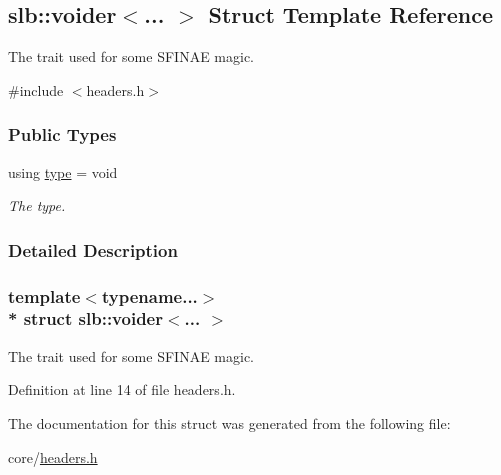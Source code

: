 \hypertarget{structslb_1_1voider}{}\subsection{slb\+:\+:voider$<$... $>$ Struct Template Reference}
\label{structslb_1_1voider}


The trait used for some S\+F\+I\+N\+AE magic.  




{\ttfamily \#include $<$headers.\+h$>$}

\subsubsection*{Public Types}
\begin{DoxyCompactItemize}
\item 
using \hyperlink{structslb_1_1voider_aee9206a8e60e9a1cea1b4102ff9a09aa}{type} = void\hypertarget{structslb_1_1voider_aee9206a8e60e9a1cea1b4102ff9a09aa}{}\label{structslb_1_1voider_aee9206a8e60e9a1cea1b4102ff9a09aa}

\begin{DoxyCompactList}\small\item\em The type. \end{DoxyCompactList}\end{DoxyCompactItemize}


\subsubsection{Detailed Description}
\subsubsection*{template$<$typename...$>$\\*
struct slb\+::voider$<$... $>$}

The trait used for some S\+F\+I\+N\+AE magic. 

Definition at line 14 of file headers.\+h.



The documentation for this struct was generated from the following file\+:\begin{DoxyCompactItemize}
\item 
core/\hyperlink{core_2headers_8h}{headers.\+h}\end{DoxyCompactItemize}
